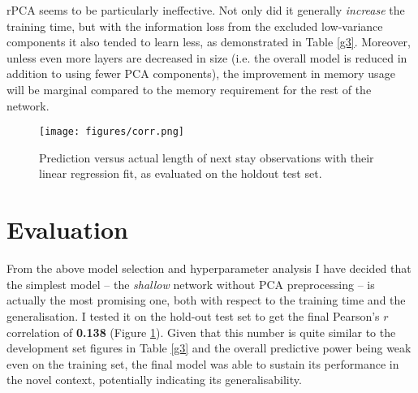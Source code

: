\documentclass[10pt, twocolumn]{article}
\begin{document}
rPCA seems to be particularly ineffective. Not only did it generally \textit{increase} the training time, but with the information loss from the excluded low-variance components it also tended to learn less, as demonstrated in Table \ref{g3}. Moreover, unless even more layers are decreased in size (i.e. the overall model is reduced in addition to using fewer PCA components), the improvement in memory usage will be marginal compared to the memory requirement for the rest of the network. 

\begin{figure}[htb!]
	\centering
	\texttt{[image: figures/corr.png]}
	\caption{Prediction versus actual length of next stay observations with their linear regression fit, as evaluated on the holdout test set.}\label{corr}
\end{figure}

\section{Evaluation}

From the above model selection and hyperparameter analysis I have decided that the simplest model – the \textit{shallow} network without PCA preprocessing – is actually the most promising one, both with respect to the training time and the generalisation. I tested it on the hold-out test set to get the final Pearson's $r$ correlation of \textbf{0.138} (Figure \ref{corr}). Given that this number is quite similar to the development set figures in Table \ref{g3} and the overall predictive power being weak even on the training set, the final model was able to sustain its performance in the novel context, potentially indicating its generalisability.

\medskip
 


\end{document}
